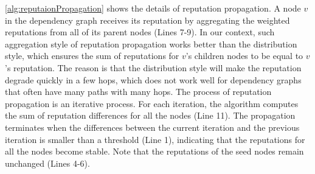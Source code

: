 

\cref{alg:reputaionPropagation} shows the details of reputation propagation. 
A node $v$ in the dependency graph receives its reputation by aggregating the weighted reputations from all of its parent nodes (Lines 7-9).
In our context, such aggregation style of reputation propagation works better than the distribution style, which ensures the sum of reputations for $v$'s children nodes to be equal to $v$'s reputation.
The reason is that the distribution style will make the reputation degrade quickly in a few hops, which does not work well for dependency graphs that often have many paths with many hops.
The process of reputation propagation is an iterative process.
For each iteration, the algorithm computes the sum of reputation differences for all the nodes (Line 11).
The propagation terminates when the differences between the current iteration and the previous iteration is smaller than a threshold (Line 1), indicating that the reputations for all the nodes become stable.
Note that the reputations of the seed nodes remain unchanged (Lines 4-6).




